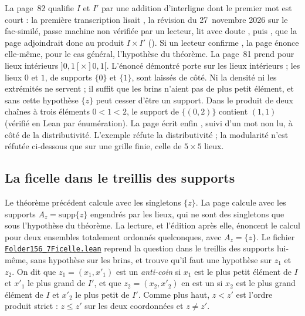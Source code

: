 \begin{remarque}
La page~82 qualifie $I$ et $I'$ par une addition d'interligne dont le premier mot est court : la première transcription lisait , la révision du 27~novembre 2026 sur le fac-similé, passe machine non vérifiée par un lecteur, lit avec doute , puis , que la page adjoindrait donc au produit $I \times I'$ (). Si un lecteur confirme , la page énonce elle-même, pour le cas général, l'hypothèse du théorème. La page~81 prend pour lieux intérieurs $]0,1[ \times ]0,1[$. L'énoncé démontré porte sur les lieux intérieurs ; les lieux $0$ et $1$, de supports $\{0\}$ et $\{1\}$, sont laissés de côté. Ni la densité ni les extrémités ne servent ; il suffit que les brins n'aient pas de plus petit élément, et sans cette hypothèse $\{z\}$ peut cesser d'être un support. Dans le produit de deux chaînes à trois éléments $0 < 1 < 2$, le support de $\{(0, 2)\}$ contient $(1, 1)$ (vérifié en Lean par énumération). La page écrit enfin , suivi d'un mot non lu, à côté de la distributivité. L'exemple réfute la distributivité ; la modularité n'est réfutée ci-dessous que sur une grille finie, celle de $5 \times 5$ lieux.
\end{remarque}

\subsection*{La ficelle dans le treillis des supports}

Le théorème précédent calcule avec les singletons $\{z\}$. La page calcule avec les supports $A_z = \mathrm{supp}\{z\}$ engendrés par les lieux, qui ne sont des singletons que sous l'hypothèse du théorème. La lecture, et l'édition après elle, énoncent le calcul pour deux ensembles totalement ordonnés quelconques, avec $A_z = \{z\}$. Le fichier \href{\leanblobmain/Order/Folder156_7Ficelle.lean}{\texttt{Folder156\_7Ficelle.\allowbreak{}lean}} reprend la question dans le treillis des supports lui-même, sans hypothèse sur les brins, et trouve qu'il faut une hypothèse sur $z_1$ et $z_2$. On dit que $z_1 = (x_1, x'_1)$ est un \emph{anti-coin} si $x_1$ est le plus petit élément de $I$ et $x'_1$ le plus grand de $I'$, et que $z_2 = (x_2, x'_2)$ en est un si $x_2$ est le plus grand élément de $I$ et $x'_2$ le plus petit de $I'$. Comme plus haut, $z < z'$ est l'ordre produit strict : $z \leq z'$ sur les deux coordonnées et $z \neq z'$.

